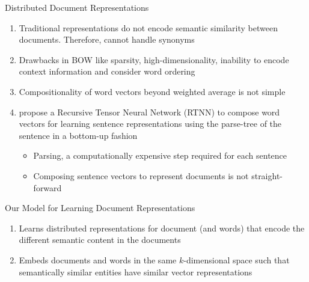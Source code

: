 \documentclass[10pt]{beamer}
\begin{document}
\begin{frame}{Distributed Document Representations}
\vfill {}
\begin{enumerate}
	\vfill\item<2-> Traditional representations do not encode semantic similarity between documents. Therefore, cannot handle synonyms
	\vfill\item<3-> Drawbacks in BOW like sparsity, high-dimensionality, inability to encode context information and consider word ordering
	\vfill\item<4-> Compositionality of word vectors beyond weighted average \cite{mitchell2010composition, zanzotto2010estimating, yessenalina2011compositional, grefenstette2013multi, mikolov2013distributed} is not simple
	\vfill\item<5-> \citet{socher2013recursive} propose a Recursive Tensor Neural Network (RTNN) to compose word vectors for learning sentence representations using the parse-tree of the sentence in a bottom-up fashion
	\begin{itemize}
		\vfill\item<6-> Parsing, a computationally expensive step required for each sentence
		\vfill\item<7-> Composing sentence vectors to represent documents is not straight-forward
	\end{itemize}
\end{enumerate}
\end{frame}



\begin{frame}{Our Model for Learning Document Representations}
\vfill {}
\vfill {}

\vfill {}
\begin{enumerate}
	\vfill\item<4-> Learns distributed representations for document (and words) that encode the different semantic content in the documents
	\vfill\item<5-> Embeds documents and words in the same $k$-dimensional space such that semantically similar entities have similar vector representations
\end{enumerate}

\end{frame}
\end{document}
